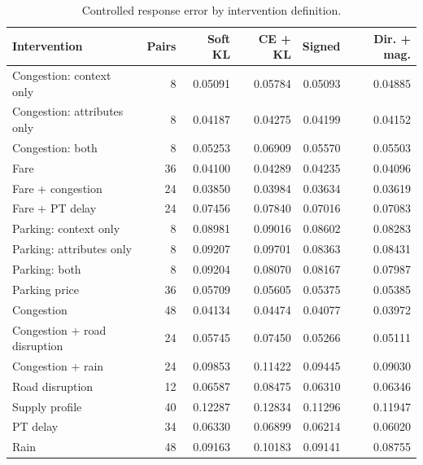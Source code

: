 \begin{table}[pos=htbp]
\centering\footnotesize
\caption{Controlled response error by intervention definition.}
\label{tab:response_interventions}
\setlength{\tabcolsep}{3pt}
\begin{tabular}{@{}lrrrrr@{}}
\toprule
Intervention & Pairs & Soft KL & CE + KL & Signed & Dir. + mag. \\
\midrule
Congestion: context only & 8 & 0.05091 & 0.05784 & 0.05093 & 0.04885 \\
Congestion: attributes only & 8 & 0.04187 & 0.04275 & 0.04199 & 0.04152 \\
Congestion: both & 8 & 0.05253 & 0.06909 & 0.05570 & 0.05503 \\
Fare & 36 & 0.04100 & 0.04289 & 0.04235 & 0.04096 \\
Fare + congestion & 24 & 0.03850 & 0.03984 & 0.03634 & 0.03619 \\
Fare + PT delay & 24 & 0.07456 & 0.07840 & 0.07016 & 0.07083 \\
Parking: context only & 8 & 0.08981 & 0.09016 & 0.08602 & 0.08283 \\
Parking: attributes only & 8 & 0.09207 & 0.09701 & 0.08363 & 0.08431 \\
Parking: both & 8 & 0.09204 & 0.08070 & 0.08167 & 0.07987 \\
Parking price & 36 & 0.05709 & 0.05605 & 0.05375 & 0.05385 \\
Congestion & 48 & 0.04134 & 0.04474 & 0.04077 & 0.03972 \\
Congestion + road disruption & 24 & 0.05745 & 0.07450 & 0.05266 & 0.05111 \\
Congestion + rain & 24 & 0.09853 & 0.11422 & 0.09445 & 0.09030 \\
Road disruption & 12 & 0.06587 & 0.08475 & 0.06310 & 0.06346 \\
Supply profile & 40 & 0.12287 & 0.12834 & 0.11296 & 0.11947 \\
PT delay & 34 & 0.06330 & 0.06899 & 0.06214 & 0.06020 \\
Rain & 48 & 0.09163 & 0.10183 & 0.09141 & 0.08755 \\
\bottomrule
\end{tabular}
\par{}
\end{table}

